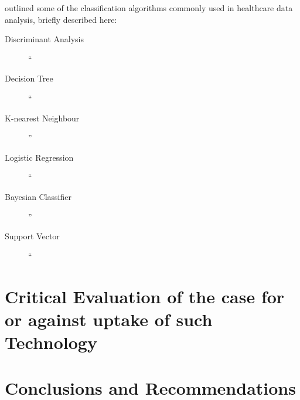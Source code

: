 \documentclass[a4paper,12pt]{article}
\begin{document}
\textcite{Jothi2015} outlined some of the classification algorithms commonly used in healthcare data analysis, briefly described here:

\begin{description}
    \item[Discriminant Analysis] ``
    \item[Decision Tree] ``
    \item[K-nearest Neighbour] ''
    \item[Logistic Regression] ``
    \item[Bayesian Classifier] ''
    \item[Support Vector] ``
\end{description}


\section{Critical Evaluation of the case for or against uptake of such Technology}



\section{Conclusions and Recommendations}
\printbibliography
\end{document}
